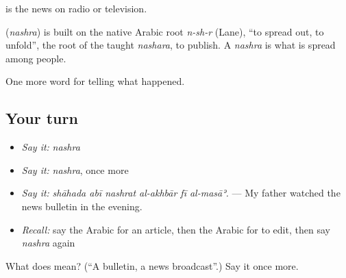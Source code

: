   is the news on radio or television.

\begin{cousinweb}
\textbf{} (\emph{nashra}) is built on the native Arabic root \emph{n-sh-r} (Lane), \textquotedblleft{}to spread out, to unfold\textquotedblright{}, the root of the taught \emph{nashara}, to publish. A \emph{nashra} is what is spread among people.
\end{cousinweb}

\begin{grammarlens}[title={What you've built}]
One more word for telling what happened.
\end{grammarlens}

\subsection*{Your turn}
\begin{itemize}
\raggedright
  \item \emph{Say it:} \emph{nashra}
  \item \emph{Say it:} \emph{nashra}, once more
  \item \emph{Say it:} \emph{shāhada abī nashrat al-akhbār fī al-masāʾ.} — My father watched the news bulletin in the evening.
  \item \emph{Recall:} say the Arabic for an article, then the Arabic for to edit, then say \emph{nashra} again
\end{itemize}

\begin{tcolorbox}[breakable,colback=teal!4,colframe=teal!35!black,title={Before you move on}]
What does  mean? (\textquotedblleft{}A bulletin, a news broadcast\textquotedblright{}.) Say it once more.
\end{tcolorbox}

